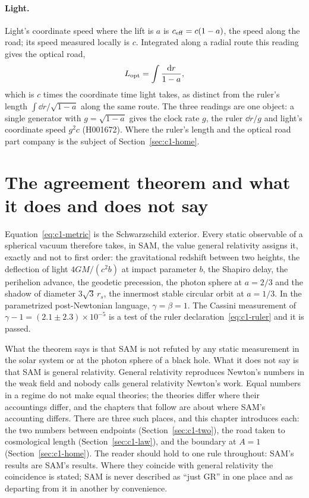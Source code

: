 \paragraph{Light.} Light's coordinate speed where the lift is $a$ is $c_{\rm eff}=c(1-a)$, the speed along the road; its speed measured locally is $c$. Integrated along a radial route this reading gives the optical road,
\begin{equation}
L_{\rm opt}=\int\frac{\mathrm{d} r}{1-a},
\label{eq:c1-optical-road}
\end{equation}
which is $c$ times the coordinate time light takes, as distinct from the ruler's length $\int\dd r/\sqrt{1-a}$ along the same route. The three readings are one object: a single generator with $g=\sqrt{1-a}$ gives the clock rate $g$, the ruler $\dd r/g$ and light's coordinate speed $g^2c$ (H001672). Where the ruler's length and the optical road part company is the subject of Section~\ref{sec:c1-home}.

\section{The agreement theorem and what it does and does not say}
\label{sec:c1-agreement}

Equation~\eqref{eq:c1-metric} is the Schwarzschild exterior. Every static observable of a spherical vacuum therefore takes, in SAM, the value general relativity assigns it, exactly and not to first order: the gravitational redshift between two heights, the deflection of light $4GM/(c^2 b)$ at impact parameter $b$, the Shapiro delay, the perihelion advance, the geodetic precession, the photon sphere at $a=2/3$ and the shadow of diameter $3\sqrt3\,r_s$, the innermost stable circular orbit at $a=1/3$. In the parametrized post-Newtonian language, $\gamma=\beta=1$. The Cassini measurement of $\gamma-1=(2.1\pm2.3)\times10^{-5}$ is a test of the ruler declaration~\eqref{eq:c1-ruler} and it is passed.

What the theorem says is that SAM is not refuted by any static measurement in the solar system or at the photon sphere of a black hole. What it does not say is that SAM is general relativity. General relativity reproduces Newton's numbers in the weak field and nobody calls general relativity Newton's work. Equal numbers in a regime do not make equal theories; the theories differ where their accountings differ, and the chapters that follow are about where SAM's accounting differs. There are three such places, and this chapter introduces each: the two numbers between endpoints (Section~\ref{sec:c1-two}), the road taken to cosmological length (Section~\ref{sec:c1-law}), and the boundary at $A=1$ (Section~\ref{sec:c1-home}). The reader should hold to one rule throughout: SAM's results are SAM's results. Where they coincide with general relativity the coincidence is stated; SAM is never described as ``just GR'' in one place and as departing from it in another by convenience.

